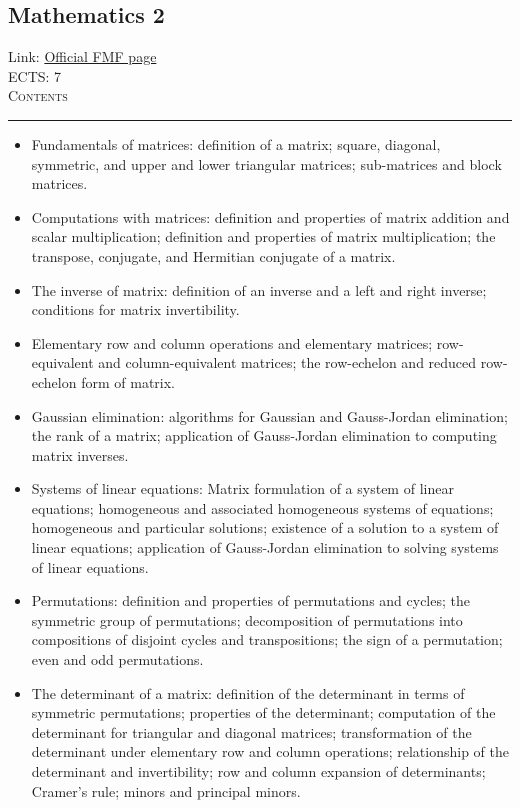 \documentclass[11pt, a4paper]{article}
\newenvironment{course}[3]{
\subsection{#1}%
Link: \href{#2}{Official FMF page}\\%
ECTS: #3%
\vspace{1ex}
\\
{\large \textsc{Contents}}\\[-0.9ex]%
\rule{\textwidth}{0.5pt}
\vspace{-3ex}
}
{}
\newenvironment{chapter}[1]{
\begin{tcolorbox}[title=#1, breakable]
}
{\end{tcolorbox}}
\begin{document}
\begin{course}{Mathematics 2}{https://www.fmf.uni-lj.si/en/study-physics/programmes/1fiz/2020/7000777/courses/521/}{7}
    \label{mathematics-2}

    \begin{chapter}{Matrices}
        \begin{itemize}
        
            \item Fundamentals of matrices: definition of a matrix; square, diagonal, symmetric, and upper and lower triangular matrices;
            sub-matrices and block matrices.

            \item Computations with matrices: definition and properties of matrix addition and scalar multiplication; definition and properties of matrix multiplication;
            the transpose, conjugate, and Hermitian conjugate of a matrix.

            \item The inverse of matrix: definition of an inverse and a left and right inverse; conditions for matrix invertibility.

            \item Elementary row and column operations and elementary matrices; row-equivalent and column-equivalent matrices; the row-echelon and reduced row-echelon form of matrix.
            
            \item Gaussian elimination: algorithms for Gaussian and Gauss-Jordan elimination; the rank of a matrix; application of Gauss-Jordan elimination to computing matrix inverses.

            \item Systems of linear equations: Matrix formulation of a system of linear equations; homogeneous and associated homogeneous systems of equations; homogeneous and particular solutions; existence of a solution to a system of linear equations; application of Gauss-Jordan elimination to solving systems of linear equations.

            \item Permutations: definition and properties of permutations and cycles; the symmetric group of permutations; decomposition of permutations into compositions of disjoint cycles and transpositions; the sign of a permutation; even and odd permutations.

            \item The determinant of a matrix: definition of the determinant in terms of symmetric permutations; properties of the determinant; computation of the determinant for triangular and diagonal matrices; transformation of the determinant under elementary row and column operations; relationship of the determinant and invertibility; row and column expansion of determinants; Cramer's rule; minors and principal minors.
        

\end{itemize}
\end{chapter}
\end{course}
\end{document}
